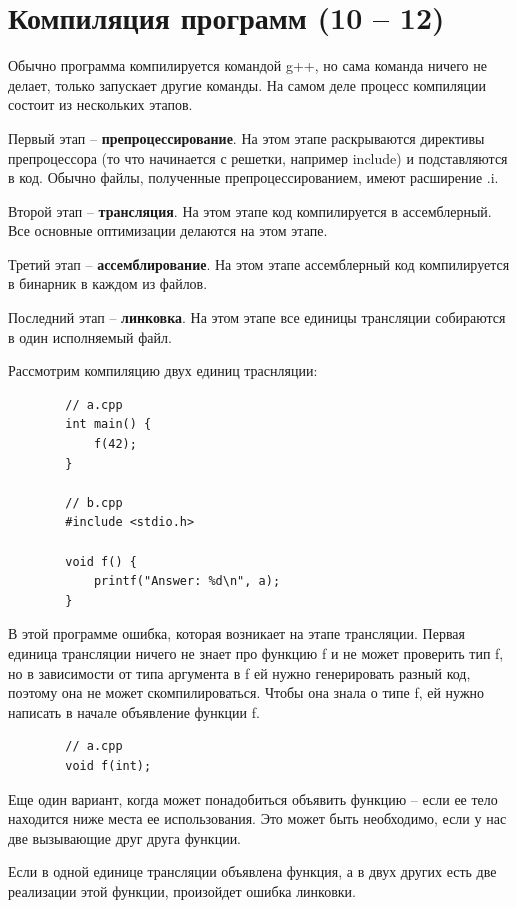 \documentclass[12pt, a4paper]{article}
\begin{document}
	\section{Компиляция программ (10 -- 12)}
	Обычно программа компилируется командой g++, но сама команда ничего не делает, только запускает другие команды. На самом деле процесс компиляции состоит из нескольких этапов.
	\\\par Первый этап -- \textbf{препроцессирование}. На этом этапе раскрываются директивы препроцессора (то что начинается с решетки, например include) и подставляются в код. Обычно файлы, полученные препроцессированием, имеют расширение .i.
	\\\par Второй этап -- \textbf{трансляция}. На этом этапе код компилируется в ассемблерный. Все основные оптимизации делаются на этом этапе.
	\\\par Третий этап -- \textbf{ассемблирование}. На этом этапе ассемблерный код компилируется в бинарник в каждом из файлов.
	\\\par Последний этап -- \textbf{линковка}. На этом этапе все единицы трансляции собираются в один исполняемый файл.
	\\\par Рассмотрим компиляцию двух единиц траснляции: 
	\begin{verbatim}
		// a.cpp
		int main() {
			f(42);
		}
		
		// b.cpp
		#include <stdio.h>
		
		void f() {
			printf("Answer: %d\n", a);
		}
	\end{verbatim}
	В этой программе ошибка, которая возникает на этапе трансляции. Первая единица трансляции ничего не знает про функцию f и не может проверить тип f, но в зависимости от типа аргумента в f ей нужно генерировать разный код, поэтому она не может скомпилироваться. Чтобы она знала о типе f, ей нужно написать в начале объявление функции f.
	\begin{verbatim}
		// a.cpp
		void f(int);
	\end{verbatim}
	Еще один вариант, когда может понадобиться объявить функцию -- если ее тело находится ниже места ее использования. Это может быть необходимо, если у нас две вызывающие друг друга функции.
	\par Если в одной единице трансляции объявлена функция, а в двух других есть две реализации этой функции, произойдет ошибка линковки.
\end{document}
